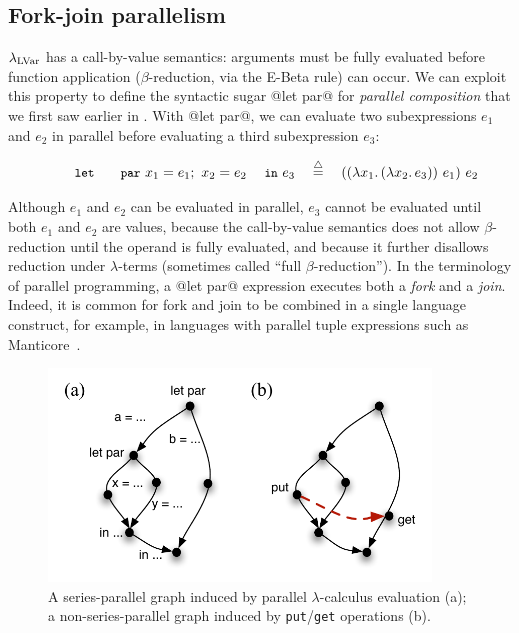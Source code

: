 \subsection{Fork-join parallelism}\label{subsection:fork-join}

$\lambda_{\textrm{LVar}}$ has a call-by-value semantics: arguments must be fully
evaluated before function application ($\beta$-reduction, via the {\sc
  E-Beta} rule) can occur.  We can exploit this property to define the
syntactic sugar @let par@ for \emph{parallel composition} that we first saw earlier in .  With @let par@, we can evaluate two subexpressions $e_1$ and $e_2$ in parallel before evaluating a third subexpression $e_3$:

\vspace{-8mm}
\singlespacing
\begin{displaymath}
\letparexp{x_1}{e_1}{x_2}{e_2}{e_3} \quad\defeq\quad \app{(\app{(\lam{x_1}{(\lam{x_2}{e_3})})}{e_1})}{e_2}
\end{displaymath}
\doublespacing

Although $e_1$ and $e_2$ can be evaluated in parallel, $e_3$ cannot be
evaluated until both $e_1$ and $e_2$ are values, because the
call-by-value semantics does not allow $\beta$-reduction until the
operand is fully evaluated, and because it further disallows reduction
under $\lambda$-terms (sometimes called ``full $\beta$-reduction'').
In the terminology of parallel programming, a @let par@ expression
executes both a \emph{fork} and a \emph{join}.  Indeed, it is common
for fork and join to be combined in a single language construct, for
example, in languages with parallel tuple expressions such as
Manticore~\cite{manticore_parallel_tuples}.

\begin{figure}[tb]
  \centering 
\includegraphics[width=4in]{chapter2/figures/lvars-series-parallel.pdf} 
\caption{A series-parallel graph induced by parallel
  $\lambda$-calculus evaluation (a); a non-series-parallel graph
  induced by \lstinline|put|/\lstinline|get| operations (b).}
  \label{f:lvars-series-parallel}
\end{figure}

